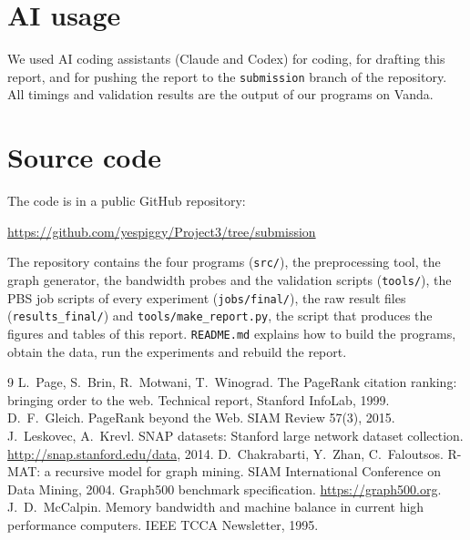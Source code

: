 \documentclass[11pt,a4paper]{article}
\newcommand{\code}[1]{\texttt{#1}}
\begin{document}
\section*{AI usage}

We used AI coding assistants (Claude and Codex) for coding, for drafting this report, and for pushing the report
to the \code{submission} branch of the repository. All timings and validation results are the output of our
programs on Vanda.

\section*{Source code}

The code is in a public GitHub repository:
\begin{center}
\url{https://github.com/yespiggy/Project3/tree/submission}
\end{center}
The repository contains the four
programs (\code{src/}), the preprocessing tool, the graph generator, the bandwidth probes and the validation
scripts (\code{tools/}), the PBS job scripts of every experiment (\code{jobs/final/}), the raw result files
(\code{results\_final/}) and \code{tools/make\_report.py}, the script that produces the figures and tables of
this report. \code{README.md} explains how to build the programs, obtain the data, run the
experiments and rebuild the report.

\begin{thebibliography}{9}\small\sloppy
{} L.~Page, S.~Brin, R.~Motwani, T.~Winograd. The PageRank citation ranking: bringing order to the
  web. Technical report, Stanford InfoLab, 1999.
 D.~F.~Gleich. PageRank beyond the Web. SIAM Review 57(3), 2015.
 J.~Leskovec, A.~Krevl. SNAP datasets: Stanford large network dataset collection.
  \url{http://snap.stanford.edu/data}, 2014.
 D.~Chakrabarti, Y.~Zhan, C.~Faloutsos. R-MAT: a recursive model for graph mining. SIAM
  International Conference on Data Mining, 2004.
 Graph500 benchmark specification. \url{https://graph500.org}.
 J.~D.~McCalpin. Memory bandwidth and machine balance in current high performance computers. IEEE
  TCCA Newsletter, 1995.
\end{thebibliography}
\end{document}
